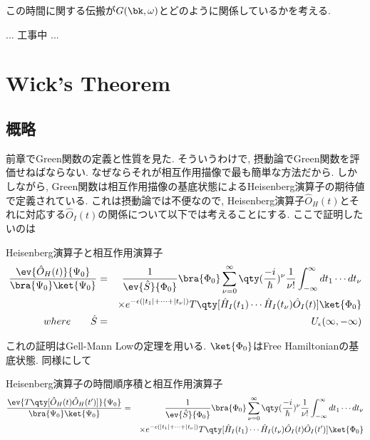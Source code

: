 \documentclass[10.5pt,a4paper]{jreport}
\begin{document}
この時間に関する伝搬が$G(\bk, \omega)$とどのように関係しているかを考える.

... 工事中 ...

\section{Wick's Theorem}
\subsection{概略}
前章でGreen関数の定義と性質を見た. そういうわけで, 摂動論でGreen関数を評価せねばならない. なぜならそれが相互作用描像で最も簡単な方法だから. しかしながら, Green関数は相互作用描像の基底状態によるHeisenberg演算子の期待値で定義されている. これは摂動論では不便なので, Heisenberg演算子$\hat{O}_H(t)$とそれに対応する$\hat{O}_I(t)$の関係について以下では考えることにする. ここで証明したいのは
\begin{itembox}[c]{Heisenberg演算子と相互作用演算子}
  \begin{eqnarray}
    \nonumber    \frac{\ev{\hat{O}_H(t)}{\Psi_0}}{\bra{\Psi_0}\ket{\Psi_0}} &=& \frac{1}{\ev{\hat{S}}{\Phi_0}}\bra{\Phi_0}\sum_{\nu = 0}^\infty \qty(\frac{-i}{\hbar})^\nu \frac{1}{\nu !}\int_{-\infty}^\infty dt_1\cdots dt_\nu\\
    &&\times e^{-\epsilon(|t_1| + \cdots + |t_\nu|)} T\qty[\hat{H}_I(t_1)\cdots\hat{H}_I(t_\nu)\hat{O}_I(t)]\ket{\Phi_0}\\
    \nonumber where\hspace{0.7cm}  \hat{S} &=& U_\epsilon(\infty, -\infty)\label{wick1}
  \end{eqnarray}
\end{itembox}

これの証明はGell-Mann Lowの定理を用いる. $\ket{\Phi_0}$はFree Hamiltonianの基底状態. 同様にして
\begin{itembox}[c]{Heisenberg演算子の時間順序積と相互作用演算子}
  \begin{eqnarray}
    \nonumber    \frac{\ev{T\qty[\hat{O}_H(t)\hat{O}_H(t')]}{\Psi_0}}{\bra{\Psi_0}\ket{\Psi_0}} &=& \frac{1}{\ev{\hat{S}}{\Phi_0}}\bra{\Phi_0}\sum_{\nu = 0}^\infty \qty(\frac{-i}{\hbar})^\nu \frac{1}{\nu !}\int_{-\infty}^\infty dt_1\cdots dt_\nu\\
    &&\times e^{-\epsilon(|t_1| + \cdots + |t_\nu|)} T\qty[\hat{H}_I(t_1)\cdots\hat{H}_I(t_\nu)\hat{O}_I(t)\hat{O}_I(t')]\ket{\Phi_0}\label{wick2}
  \end{eqnarray}
\end{itembox}
\end{document}
